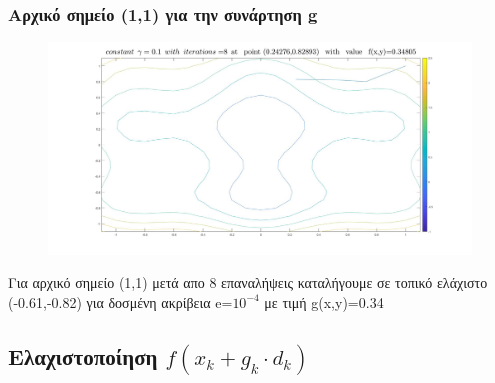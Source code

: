 \documentclass{article}
\begin{document}
\subsubsection*{Αρχικό σημείο (1,1) για την συνάρτηση g}
\begin{figure}[h!]	
     \centering  
     \advance\leftskip-0.2cm  
  \includegraphics[width=140mm,scale=2]{g1c.jpg}
\end{figure} 
Για αρχικό σημείο (1,1) μετά απο 8 επαναλήψεις καταλήγουμε σε τοπικό ελάχιστο (-0.61,-0.82) για δοσμένη ακρίβεια e=$10^{-4}$ με τιμή g(x,y)=0.34 

\newpage

\subsection*{Ελαχιστοποίηση $f(x_k+g_k \cdot d_k )$}

 
\end{document}
